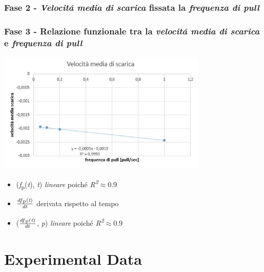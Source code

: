 \documentclass{article}
\begin{document}
\subsubsection{Fase 2 - \textit{Velocit\'a media di scarica} fissata la \textit{frequenza di pull}}

\subsubsection{Fase 3 - Relazione funzionale tra la \textit{velocit\'a media di scarica} e \textit{frequenza di pull}}

\begin{center}
\includegraphics[width=0.75\textwidth]{veloc.jpg} %
\label{fig:Relazione funzionale}
\end{center}

\begin{itemize}
\item{(\textit{f}\textsubscript{p}(\textit{t}), \textit{t})  \textit{lineare} poich\'e \textit{R\textsuperscript{2}}\(\approx\)0.9}
\item{\(\frac{df\textsubscript{p}(\textit{t})}{dt}\)  derivata rispetto al tempo}
\item{(\(\frac{df\textsubscript{p}(\textit{t})}{dt}\), \textit{p})  \textit{lineare} poich\'e \textit{R\textsuperscript{2}}\(\approx\)0.9} 
\end{itemize}



\section{Experimental Data}
\end{document}
